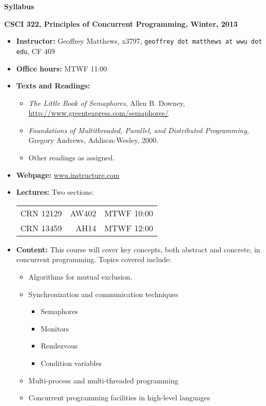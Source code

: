 \documentclass{article}
\begin{document}
\centerline{\large \bf Syllabus}

\centerline{\bf CSCI 322, Principles of Concurrent Programming, Winter, 2013}

\begin{itemize}

\item
{\bf Instructor:} Geoffrey Matthews, x3797, {\tt  geoffrey dot matthews at wwu dot edu}, CF 469
\item
{\bf Office hours:} MTWF 11:00
\item
{\bf Texts and Readings:} 
\begin{itemize}
\item {\em The Little Book of Semaphores}, Allen B. Downey, 
\url{http://www.greenteapress.com/semaphores/}
\item {\em Foundations of Multithreaded, Parallel, and Distributed Programming}, Gregory Andrews, Addison-Wesley, 2000.
\item Other readings as assigned.
\end{itemize}
\item {\bf Webpage:}  \url{wwu.instructure.com}
\item
{\bf Lectures:} Two sections:
\begin{tabular}{rrr}
CRN 12129 & AW402 & MTWF 10:00\\
CRN 13459 & AH14 & MTWF 12:00\\
\end{tabular}
\item
{\bf Content:}
This course will cover key concepts, both abstract and concrete, in
concurrent programming.  Topics covered include:
\begin{itemize}
\item Algorithms for mutual exclusion.
\item Synchronization and communication techniques
\begin{itemize}
\item Semaphores \item Monitors \item Rendezvous 
\item Condition variables
\end{itemize}
\item Multi-process and multi-threaded programming
\item Concurrent programming facilities in high-level languages

\end{itemize}
\end{itemize}
\end{document}
